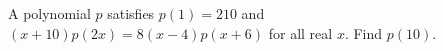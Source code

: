 A polynomial $p$ satisfies $p(1)=210$ and $(x+10)p(2x)=8(x-4)p(x+6)$ for all real $x$. Find $p(10)$.
